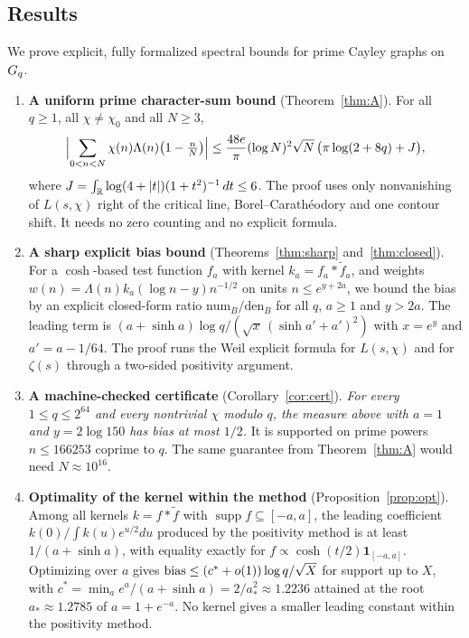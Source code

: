 \subsection{Results}
We prove explicit, fully formalized spectral bounds for prime Cayley graphs on $G_q$.
\begin{enumerate}
\item \textbf{A uniform prime character-sum bound} (Theorem~\ref{thm:A}). For all $q\ge1$, all
  $\chi\ne\chi_0$ and all $N\ge3$,
  \[
    \Bigl\lvert\sum_{0<n<N}\chi(n)\Lambda(n)\bigl(1-\tfrac nN\bigr)\Bigr\rvert
    \le \frac{48e}{\pi}(\log N)^2\sqrt N\,\bigl(\pi\log(2+8q)+J\bigr),
  \]
  where $J=\int_{\mathbb{R}}\log(4+|t|)(1+t^2)^{-1}\,dt\le6$. The proof uses only nonvanishing of $L(s,\chi)$
  right of the critical line, Borel--Carath\'eodory and one contour shift. It needs no zero counting
  and no explicit formula.
\item \textbf{A sharp explicit bias bound} (Theorems~\ref{thm:sharp} and~\ref{thm:closed}). For a
  $\cosh$-based test function $f_a$ with kernel $k_a=f_a*\tilde f_a$, and weights
  $w(n)=\Lambda(n)k_a(\log n-y)n^{-1/2}$ on units $n\le e^{y+2a}$, we bound the bias by an explicit
  closed-form ratio $\mathrm{num}_B/\mathrm{den}_B$ for all $q$, $a\ge1$ and $y>2a$. The leading term
  is $(a+\sinh a)\log q/(\sqrt{x}\,(\sinh a'+a')^2)$ with $x=e^y$ and $a'=a-1/64$. The proof runs the
  Weil explicit formula for $L(s,\chi)$ and for $\zeta(s)$ through a two-sided positivity argument.
\item \textbf{A machine-checked certificate} (Corollary~\ref{cor:cert}). \emph{For every
  $1\le q\le2^{64}$ and every nontrivial $\chi$ modulo $q$, the measure above with $a=1$ and
  $y=2\log150$ has bias at most $1/2$.} It is supported on prime powers $n\le166253$ coprime to $q$.
  The same guarantee from Theorem~\ref{thm:A} would need $N\approx10^{16}$.
\item \textbf{Optimality of the kernel within the method} (Proposition~\ref{prop:opt}). Among all
  kernels $k=f*\tilde f$ with $\operatorname{supp}f\subseteq[-a,a]$, the leading coefficient
  $k(0)/\int k(u)e^{u/2}du$ produced by the positivity method is at least $1/(a+\sinh a)$, with
  equality exactly for $f\propto\cosh(t/2)\mathbf 1_{[-a,a]}$. Optimizing over $a$ gives
  $\operatorname{bias}\le(c^*+o(1))\log q/\sqrt X$ for support up to $X$, with $c^*=\min_a e^a/(a+\sinh a)=2/a_*^2\approx1.2236$
  attained at the root $a_*\approx1.2785$ of $a=1+e^{-a}$. No kernel gives a smaller leading constant
  within the positivity method.
\end{enumerate}

